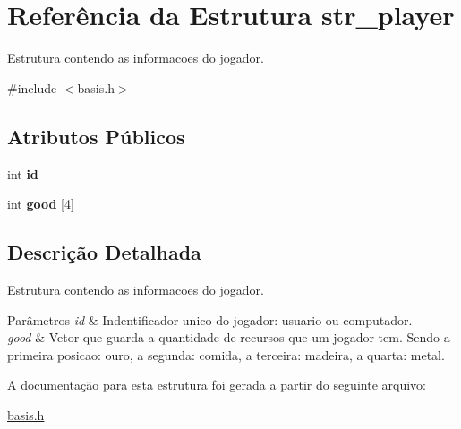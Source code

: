\hypertarget{structstr__player}{\section{\-Referência da \-Estrutura str\-\_\-player}
\label{structstr__player}
}


\-Estrutura contendo as informacoes do jogador.  




{\ttfamily \#include $<$basis.\-h$>$}

\subsection*{\-Atributos \-Públicos}
\begin{DoxyCompactItemize}
\item 
\hypertarget{structstr__player_a5d79d4b326032ea379c3c7a9614226fb}{int {\bfseries id}}\label{structstr__player_a5d79d4b326032ea379c3c7a9614226fb}

\item 
\hypertarget{structstr__player_a80cb4c90efb08267862ab49cdd15d07b}{int {\bfseries good} \mbox{[}4\mbox{]}}\label{structstr__player_a80cb4c90efb08267862ab49cdd15d07b}

\end{DoxyCompactItemize}


\subsection{\-Descrição \-Detalhada}
\-Estrutura contendo as informacoes do jogador. 


\begin{DoxyParams}{\-Parâmetros}
{\em id} & \-Indentificador unico do jogador\-: usuario ou computador.\\
\hline
{\em good} & \-Vetor que guarda a quantidade de recursos que um jogador tem. \-Sendo a primeira posicao\-: ouro, a segunda\-: comida, a terceira\-: madeira, a quarta\-: metal. \\
\hline
\end{DoxyParams}


\-A documentação para esta estrutura foi gerada a partir do seguinte arquivo\-:\begin{DoxyCompactItemize}
\item 
\hyperlink{basis_8h}{basis.\-h}\end{DoxyCompactItemize}
